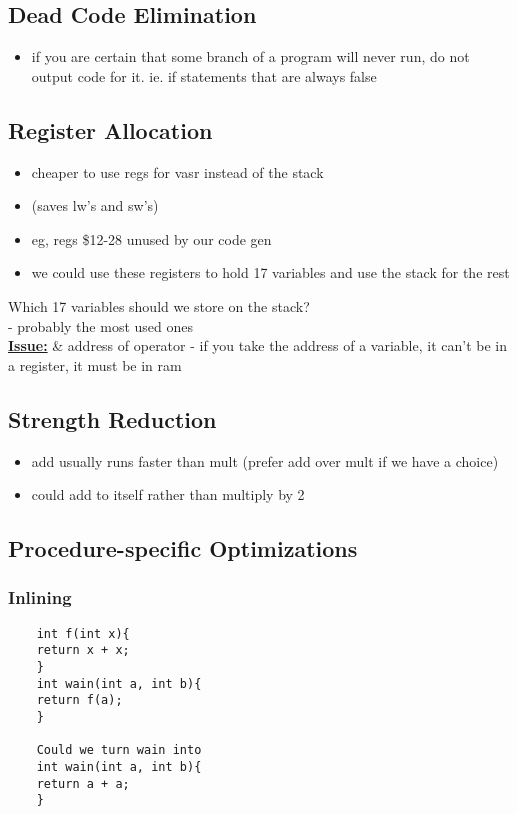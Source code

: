 \documentclass[12pt]{article}
\newcommand{\myt}[1]{\textbf{\underline{#1}}}
\begin{document}
	\subsection*{Dead Code Elimination}
	\begin{itemize}
		\item if you are certain that some branch of a program will never run, do not output code for it. ie. if statements that are always false
	\end{itemize}
	
	\subsection*{Register Allocation}
	\begin{itemize}
		\item cheaper to use regs for vasr instead of the stack
		\item (saves lw's and sw's)
		\item eg, regs \$12-28 unused by our code gen
		\item we could use these registers to hold 17 variables and use the stack for the rest\\
	\end{itemize}
	Which 17 variables should we store on the stack?\\
	- probably the most used ones\\
	\myt{Issue:} \& address of operator
	- if you take the address of a variable, it can't be in a register, it must be in ram\\
	
	\subsection*{Strength Reduction}
	\begin{itemize}
		\item add usually runs faster than mult (prefer add over mult if we have a choice)
		\item could add to itself rather than multiply by 2
	\end{itemize}
	
	\subsection*{Procedure-specific Optimizations}
	\subsubsection{Inlining}
	\begin{verbatim}
	int f(int x){
	return x + x;
	}
	int wain(int a, int b){
	return f(a);
	}
	
	Could we turn wain into
	int wain(int a, int b){
	return a + a;
	}
	\end{verbatim}
	
\end{document}
